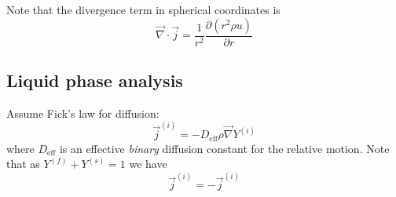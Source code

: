 \documentclass[12pt]{report}
\begin{document}
Note that the divergence term in spherical coordinates is
\begin{equation*}
  \vec{\nabla} \cdot \vec{j} =
  \frac{1}{r^2} \frac{\partial (r^2 \rho u)}{\partial r}
\end{equation*}

\subsection{Liquid phase analysis}

Assume Fick's law for diffusion:
\begin{equation}\label{eq:ficks-law}
  \vec{j}^{(i)} = -D_{\textrm{eff}} \rho \vec{\nabla} Y^{(i)}
\end{equation}
where $D_{\textrm{eff}}$ is an effective \emph{binary} diffusion constant for the relative motion.
Note that as $Y^{(f)} + Y^{(s)} = 1$ we have
\begin{equation*}
  \vec{j}^{(i)} = -\vec{j}^{(i)}
\end{equation*}
\end{document}
